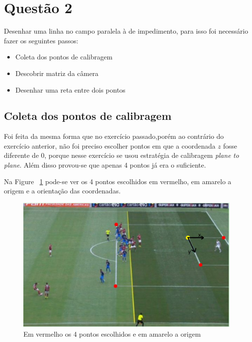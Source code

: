 \documentclass{article}
\begin{document}
\section{Questão 2}
    Desenhar uma linha no campo paralela à de impedimento, para isso foi necessário fazer os seguintes passos:
   \begin{itemize}
       \item Coleta dos pontos de calibragem
       \item Descobrir matriz da câmera
       \item Desenhar uma reta entre dois pontos
   \end{itemize}

    \subsection{Coleta dos pontos de calibragem}
    Foi feita da mesma forma que no exercício passado,porém ao contrário do exercício anterior, não foi preciso escolher pontos em que a coordenada \(z\) fosse diferente de 0, porque nesse exercício se usou estratégia de calibragem \textit{plane to plane}. Além disso provou-se que apenas 4 pontos já era o suficiente.

    Na Figure ~\ref{fig:maracana2Pontos} pode-se ver os 4 pontos escolhidos em vermelho, em amarelo a origem e a orientação das coordenadas.
        \begin{figure}[h!]
        \centering
        \includegraphics[scale=0.55]{maracana2Pontos.PNG}
        \caption{Em vermelho os 4 pontos escolhidos e em amarelo a origem}
        \label{fig:maracana2Pontos}
        \end{figure}
\end{document}
